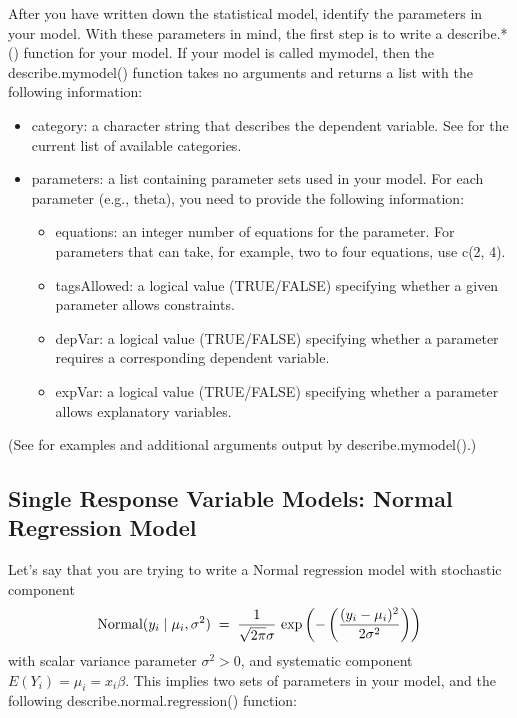 \documentclass[letterpaper,10pt,english]{sphinxmanual}
\begin{document}
After you have written down the statistical model, identify the
parameters in your model. With these parameters in mind, the first step
is to write a describe.*() function for your model. If your model is
called mymodel, then the describe.mymodel() function takes no arguments
and returns a list with the following information:
\begin{itemize}
\item {} 
category: a character string that describes the dependent variable.
See for the current list of available categories.

\item {} 
parameters: a list containing parameter sets used in your model. For
each parameter (e.g., theta), you need to provide the following
information:
\begin{itemize}
\item {} 
equations: an integer number of equations for the parameter. For
parameters that can take, for example, two to four equations, use
c(2, 4).

\item {} 
tagsAllowed: a logical value (TRUE/FALSE) specifying whether a
given parameter allows constraints.

\item {} 
depVar: a logical value (TRUE/FALSE) specifying whether a
parameter requires a corresponding dependent variable.

\item {} 
expVar: a logical value (TRUE/FALSE) specifying whether a
parameter allows explanatory variables.

\end{itemize}

\end{itemize}

(See for examples and additional arguments output by
describe.mymodel().)


\subsection{Single Response Variable Models: Normal Regression Model}
\label{8_writing_new_models:single-response-variable-models-normal-regression-model}
Let’s say that you are trying to write a Normal regression model with
stochastic component
\begin{gather}
\begin{split}\textrm{Normal}(y_i \mid \mu_i, \sigma^2) \; = \; \frac{1}{\sqrt{2 \pi} \sigma} \, \exp
\left( -\left( \frac{(y_i - \mu_i)^2}{2 \sigma^2} \right) \right)\end{split}\notag
\end{gather}
with scalar variance parameter \(\sigma^2 > 0\), and systematic
component \(E(Y_i) = \mu_i = x_i \beta\). This implies two sets of
parameters in your model, and the following describe.normal.regression()
function:
\end{document}
